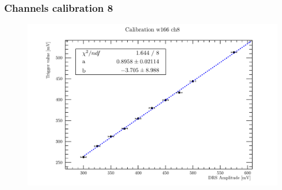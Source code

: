 
\begin{frame} [fragile]
\small
	\frametitle{Channels calibration 8}
    		\begin{figure}
		 \centering
			\includegraphics[scale=0.5]{figures/ch8.pdf}
		\end{figure}  
\end{frame}
